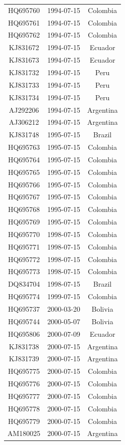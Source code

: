 \documentclass[a4paper,10pt]{article}
\begin{document}
\begin{center}
\begin{longtable}{ccc}
HQ695760 & 1994-07-15 & Colombia \\
HQ695761 & 1994-07-15 & Colombia \\
HQ695762 & 1994-07-15 & Colombia \\
KJ831672 & 1994-07-15 & Ecuador \\
KJ831673 & 1994-07-15 & Ecuador \\
KJ831732 & 1994-07-15 & Peru \\
KJ831733 & 1994-07-15 & Peru \\
KJ831734 & 1994-07-15 & Peru \\
AJ292206 & 1994-07-15 & Argentina \\
AJ306212 & 1994-07-15 & Argentina \\
KJ831748 & 1995-07-15 & Brazil \\
HQ695763 & 1995-07-15 & Colombia \\
HQ695764 & 1995-07-15 & Colombia \\
HQ695765 & 1995-07-15 & Colombia \\
HQ695766 & 1995-07-15 & Colombia \\
HQ695767 & 1995-07-15 & Colombia \\
HQ695768 & 1995-07-15 & Colombia \\
HQ695769 & 1995-07-15 & Colombia \\
HQ695770 & 1998-07-15 & Colombia \\
HQ695771 & 1998-07-15 & Colombia \\
HQ695772 & 1998-07-15 & Colombia \\
HQ695773 & 1998-07-15 & Colombia \\
DQ834704 & 1998-07-15 & Brazil \\
HQ695774 & 1999-07-15 & Colombia \\
HQ695737 & 2000-03-20 & Bolivia \\
HQ695744 & 2000-05-07 & Bolivia \\
HQ695806 & 2000-07-09 & Ecuador \\
KJ831738 & 2000-07-15 & Argentina \\
KJ831739 & 2000-07-15 & Argentina \\
HQ695775 & 2000-07-15 & Colombia \\
HQ695776 & 2000-07-15 & Colombia \\
HQ695777 & 2000-07-15 & Colombia \\
HQ695778 & 2000-07-15 & Colombia \\
HQ695779 & 2000-07-15 & Colombia \\
AM180025 & 2000-07-15 & Argentina \\

\end{longtable}
\end{center}
\end{document}
